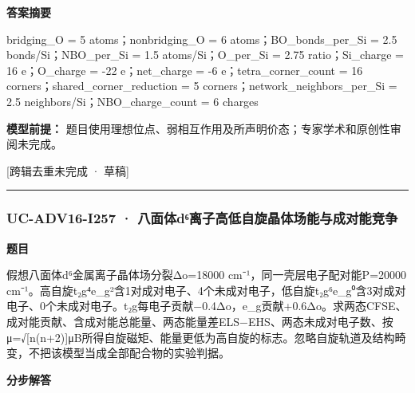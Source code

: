 \documentclass[UTF8,11pt,a4paper]{ctexart}
\begin{document}
\noindent\textbf{答案摘要}\par
bridging\_O = 5 atoms；nonbridging\_O = 6 atoms；BO\_bonds\_per\_Si = 2.5 bonds/Si；NBO\_per\_Si = 1.5 atoms/Si；O\_per\_Si = 2.75 ratio；Si\_charge = 16 e；O\_charge = -22 e；net\_charge = -6 e；tetra\_corner\_count = 16 corners；shared\_corner\_reduction = 5 corners；network\_neighbors\_per\_Si = 2.5 neighbors/Si；NBO\_charge\_count = 6 charges\par
\noindent\textbf{模型前提：}
题目使用理想位点、弱相互作用及所声明价态；专家学术和原创性审阅未完成。\par
\noindent\textcolor{red!65!black}{[跨辑去重未完成 · 草稿]} \par
\medskip\hrule\medskip
{}
\subsubsection*{UC-ADV16-I257 · 八面体d⁶离子高低自旋晶体场能与成对能竞争}
\noindent\textbf{题目}\par
假想八面体d⁶金属离子晶体场分裂Δo=18000 cm⁻¹，同一壳层电子配对能P=20000 cm⁻¹。高自旋t₂g⁴e\_g²含1对成对电子、4个未成对电子，低自旋t₂g⁶e\_g⁰含3对成对电子、0个未成对电子。t₂g每电子贡献−0.4Δo，e\_g贡献+0.6Δo。求两态CFSE、成对能贡献、含成对能总能量、两态能量差ELS−EHS、两态未成对电子数、按μ=√[n(n+2)]μB所得自旋磁矩、能量更低为高自旋的标志。忽略自旋轨道及结构畸变，不把该模型当成全部配合物的实验判据。\par
\medskip\noindent\textbf{分步解答}
\end{document}
